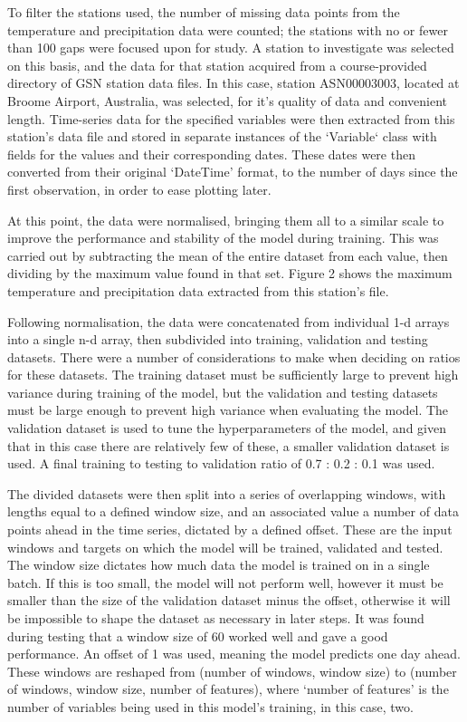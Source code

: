 \documentclass[12pt]{article}
\begin{document}
    To filter the stations used, the number of missing data points from the temperature and precipitation data were counted; the stations 
    with no or fewer than 100 gaps were focused upon for study. A station to investigate was selected on this basis, and the data for that 
    station acquired from a course-provided directory of GSN station data files. In this case, station ASN00003003, located at Broome 
    Airport, Australia, was selected, for it's quality of data and convenient length. Time-series data for the specified variables were 
    then extracted from this station's data file and stored in separate instances of the `Variable` class with fields for the values and
    their corresponding dates. These dates were then converted from their original ‘DateTime’ format, to the number of days since the first 
    observation, in order to ease plotting later.
    
    At this point, the data were normalised, bringing them all to a similar scale to improve the performance and stability of the model 
    during training. This was carried out by subtracting the mean of the entire dataset from each value, then dividing by the maximum 
    value found in that set. Figure 2 shows the maximum temperature and precipitation data extracted from this station's file.
    
    Following normalisation, the data were concatenated from individual 1-d arrays into a single n-d array, then subdivided into training, 
    validation and testing datasets. There were a number of considerations to make when deciding on ratios for these datasets. The training 
    dataset must be sufficiently large to prevent high variance during training of the model, but the validation and testing datasets must 
    be large enough to prevent high variance when evaluating the model. The validation dataset is used to tune the hyperparameters of the 
    model, and given that in this case there are relatively few of these, a smaller validation dataset is used. A final training to testing 
    to validation ratio of 0.7 : 0.2 : 0.1 was used.
    
    The divided datasets were then split into a series of overlapping windows, with lengths equal to a defined window size, and an associated 
    value a number of data points ahead in the time series, dictated by a defined offset. These are the input windows and targets on which 
    the model will be trained, validated and tested. The window size dictates how much data the model is trained on in a single batch. If 
    this is too small, the model will not perform well, however it must be smaller than the size of the validation dataset minus the offset, 
    otherwise it will be impossible to shape the dataset as necessary in later steps. It was found during testing that a window size of 60 
    worked well and gave a good performance. An offset of 1 was used, meaning the model predicts one day ahead. These windows are reshaped 
    from (number of windows, window size) to (number of windows, window size, number of features), where ‘number of features’ is the number 
    of variables being used in this model’s training, in this case, two.
    
\end{document}
